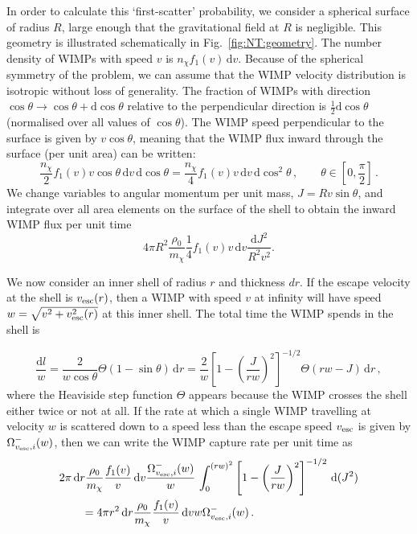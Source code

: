 In order to calculate this `first-scatter' probability, we consider a spherical surface of radius $R$, large enough that the gravitational field at $R$ is negligible. This geometry is illustrated schematically in Fig.~\ref{fig:NT:geometry}. The number density of WIMPs with speed $v$ is $n_\chi f_1(v) \,\mathrm{d}v$. Because of the spherical symmetry of the problem, we can assume that the WIMP velocity distribution is isotropic without loss of generality. The fraction of WIMPs with direction $\cos \theta \rightarrow \cos \theta + \textrm{d} \cos \theta$ relative to the perpendicular direction is $\frac{1}{2} \textrm{d}\cos\theta$ (normalised over all values of $\cos \theta$). The WIMP speed perpendicular to the surface is given by $v \cos\theta$, meaning that the WIMP flux inward through the surface (per unit area) can be written:
\begin{equation}
\frac{n_\chi}{2} f_1(v) v \cos\theta \,\textrm{d}v \,\textrm{d}\cos\theta = \frac{n_\chi}{4} f_1(v) v \,\textrm{d}v \,\textrm{d}\cos^2\theta \,, \qquad \theta \in [0, \frac{\pi}{2}]\,.
\end{equation}
We change variables to angular momentum per unit mass, $ J = R v \sin\theta $, and integrate over all area elements on the surface of the shell to obtain the inward WIMP flux per unit time
\begin{equation}
4 \pi R^2 \frac{\rho_0}{m_\chi} \frac{1}{4}f_1(v) v \, \textrm{d}v \frac{\textrm{d}J^2}{R^2 v^2}.
\end{equation}

We now consider an inner shell of radius $r$ and thickness $dr$. If the escape velocity at the shell is $\vesc(r)$, then a WIMP with speed $v$ at infinity will have speed $w = \sqrt{v^2 + \vesc^2(r)}$ at this inner shell. The total time the WIMP spends in the shell is

\begin{equation}
\frac{\textrm{d}l}{w} = \frac{2}{w \cos \theta} \Theta(1 - \sin\theta) \, \textrm{d}r = \frac{2}{w}\left[ 1 - \left(\frac{J}{rw}\right)^2\right]^{-1/2} \Theta(rw - J) \, \textrm{d}r\,,
\end{equation}
where the Heaviside step function $\Theta$ appears because the WIMP crosses the shell either twice or not at all. If the rate at which a single WIMP travelling at velocity \(w\) is scattered down to a speed less than the escape speed \(\vesc\) is given by \(\Omega^{-}_{\vesc,i}(w)\), then we can write the WIMP capture rate per unit time as
\begin{align}
&2\pi \, \textrm{d}r \frac{\rho_0}{m_\chi}\frac{f_1(v)}{v}\,\textrm{d}v \frac{\ScatRate}{w}  \, \int_{0}^{(rw)^2} \left[ 1 - \left(\frac{J}{rw}\right)^2\right]^{-1/2} \, \textrm{d}(J^2) \nonumber\\&\qquad= 4 \pi r^2 \, \textrm{d}r \frac{\rho_0}{m_\chi} \frac{f_1(v)}{v}\, \textrm{d}v w \ScatRate\,.
\end{align}


